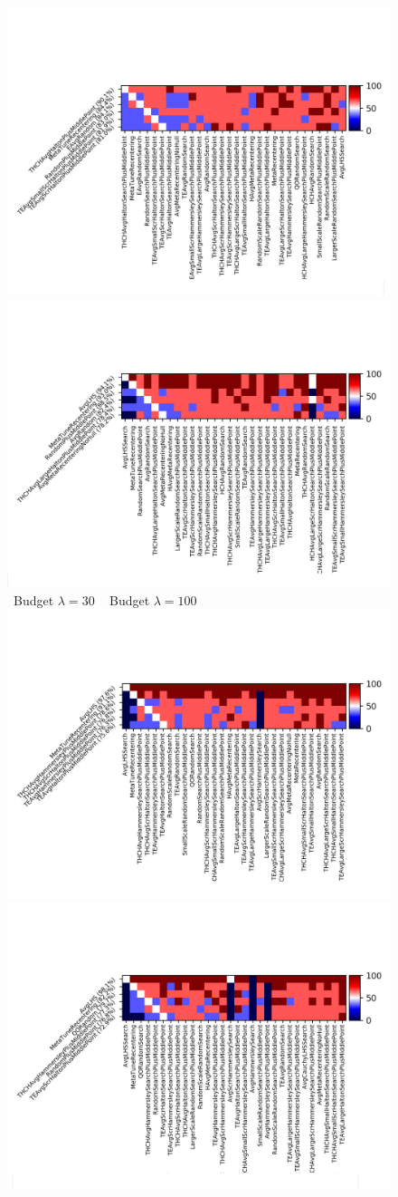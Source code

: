 \begin{figure}[t]
    \centering %
\includegraphics[trim={10 20 12 80}, clip,width=.48\textwidth]{sections/appendix/ppsn2020-rescaling/figures/fight_namesphere,budget30.png}
\includegraphics[trim={10 20 12 80}, clip,width=.48\textwidth]{sections/appendix/ppsn2020-rescaling/figures/fight_namesphere,budget100.png}\\
~\hfill Budget $\lambda=30$ \hfill ~ \hfill Budget $\lambda=100$ \hfill ~ \\
\includegraphics[trim={10 20 12 80}, clip,width=.48\textwidth]{sections/appendix/ppsn2020-rescaling/figures/fight_namesphere,budget3000.png}
\includegraphics[trim={10 20 12 80}, clip,width=.48\textwidth]{sections/appendix/ppsn2020-rescaling/figures/fight_namesphere,budget10000.png}\\

\end{figure}
